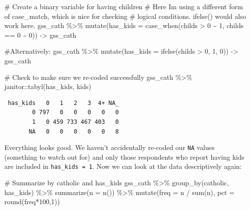 \documentclass[
  letterpaper,
]{book}
\newenvironment{Shaded}{\begin{snugshade}}{\end{snugshade}}
\newcommand{\AttributeTok}[1]{\textcolor[rgb]{0.40,0.45,0.13}{#1}}
\newcommand{\CommentTok}[1]{\textcolor[rgb]{0.37,0.37,0.37}{#1}}
\newcommand{\DecValTok}[1]{\textcolor[rgb]{0.68,0.00,0.00}{#1}}
\newcommand{\FunctionTok}[1]{\textcolor[rgb]{0.28,0.35,0.67}{#1}}
\newcommand{\NormalTok}[1]{\textcolor[rgb]{0.00,0.23,0.31}{#1}}
\newcommand{\OtherTok}[1]{\textcolor[rgb]{0.00,0.23,0.31}{#1}}
\newcommand{\SpecialCharTok}[1]{\textcolor[rgb]{0.37,0.37,0.37}{#1}}
\begin{document}
\begin{Shaded}
\begin{Highlighting}[]
\CommentTok{\# Create a binary variable for having children}
\CommentTok{\# Here I\textquotesingle{}m using a different form of case\_match, which is nice for checking}
\CommentTok{\# logical conditions.  ifelse() would also work here.}
\NormalTok{gss\_cath }\SpecialCharTok{\%\textgreater{}\%} 
  \FunctionTok{mutate}\NormalTok{(}\AttributeTok{has\_kids =} \FunctionTok{case\_when}\NormalTok{(childs }\SpecialCharTok{\textgreater{}} \DecValTok{0} \SpecialCharTok{\textasciitilde{}} \DecValTok{1}\NormalTok{,}
\NormalTok{                              childs }\SpecialCharTok{==} \DecValTok{0} \SpecialCharTok{\textasciitilde{}} \DecValTok{0}\NormalTok{)) }\OtherTok{{-}\textgreater{}}\NormalTok{ gss\_cath}

\CommentTok{\#Alternatively:}
\NormalTok{gss\_cath }\SpecialCharTok{\%\textgreater{}\%}
  \FunctionTok{mutate}\NormalTok{(}\AttributeTok{has\_kids =} \FunctionTok{ifelse}\NormalTok{(childs }\SpecialCharTok{\textgreater{}} \DecValTok{0}\NormalTok{, }\DecValTok{1}\NormalTok{, }\DecValTok{0}\NormalTok{)) }\OtherTok{{-}\textgreater{}}\NormalTok{ gss\_cath}

\CommentTok{\# Check to make sure we re{-}coded successfully}
\NormalTok{gss\_cath }\SpecialCharTok{\%\textgreater{}\%}
\NormalTok{  janitor}\SpecialCharTok{::}\FunctionTok{tabyl}\NormalTok{(has\_kids, kids)}
\end{Highlighting}
\end{Shaded}

\begin{verbatim}
 has_kids   0   1   2   3  4+ NA_
        0 797   0   0   0   0   0
        1   0 459 733 467 403   0
       NA   0   0   0   0   0   8
\end{verbatim}

Everything looks good. We haven't accidentally re-coded our \texttt{NA}
values (something to watch out for) and only those respondents who
report having kids are included in \texttt{has\_kids\ =\ 1}. Now we can
look at the data descriptively again:

\begin{Shaded}
\begin{Highlighting}[]
\CommentTok{\# Summarize by catholic and has\_kids}
\NormalTok{gss\_cath }\SpecialCharTok{\%\textgreater{}\%}
  \FunctionTok{group\_by}\NormalTok{(catholic, has\_kids) }\SpecialCharTok{\%\textgreater{}\%}
  \FunctionTok{summarize}\NormalTok{(}\AttributeTok{n =} \FunctionTok{n}\NormalTok{()) }\SpecialCharTok{\%\textgreater{}\%}
  \FunctionTok{mutate}\NormalTok{(}\AttributeTok{freq =}\NormalTok{ n }\SpecialCharTok{/} \FunctionTok{sum}\NormalTok{(n),}
         \AttributeTok{pct =} \FunctionTok{round}\NormalTok{(freq}\SpecialCharTok{*}\DecValTok{100}\NormalTok{,}\DecValTok{1}\NormalTok{))}
\end{Highlighting}
\end{Shaded}
\end{document}
